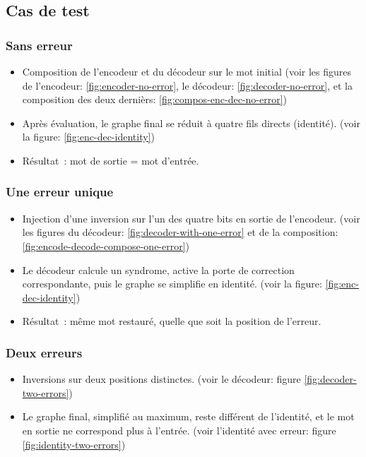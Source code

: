 \documentclass[a4paper,12pt]{article}
\begin{document}
\subsection{Cas de test}

\subsubsection*{Sans erreur}
\begin{itemize}
    \item Composition de l’encodeur et du décodeur sur le mot initial (voir les figures de l'encodeur: \ref{fig:encoder-no-error}, le décodeur: \ref{fig:decoder-no-error}, et la composition des deux dernièrs: \ref{fig:compos-enc-dec-no-error})
    \item Après évaluation, le graphe final se réduit à quatre fils directs (identité). (voir la figure: \ref{fig:enc-dec-identity})
    \item Résultat~: mot de sortie = mot d’entrée.
\end{itemize}

    
    
\subsubsection*{Une erreur unique}
\begin{itemize}
    \item Injection d’une inversion sur l’un des quatre bits en sortie de l’encodeur. (voir les figures du décodeur: \ref{fig:decoder-with-one-error} et de la composition: \ref{fig:encode-decode-compose-one-error}) 
    \item Le décodeur calcule un syndrome, active la porte de correction correspondante, puis le graphe se simplifie en identité. (voir la figure: \ref{fig:enc-dec-identity})
    \item Résultat~: même mot restauré, quelle que soit la position de l’erreur.
\end{itemize}

\subsubsection*{Deux erreurs}
\begin{itemize}
    \item Inversions sur deux positions distinctes. (voir le décodeur: figure \ref{fig:decoder-two-errors})
    \item Le graphe final, simplifié au maximum, reste différent de l’identité, et le mot en sortie ne correspond plus à l’entrée. (voir l'identité avec erreur: figure \ref{fig:identity-two-errors})
\end{itemize}
\end{document}
